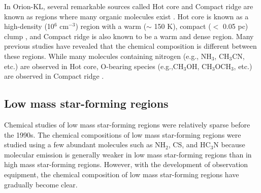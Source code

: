 In Orion-KL, several remarkable sources called Hot core and Compact ridge are known as regions where many organic molecules exist \citep{Blake+1987}. 
Hot core is known as a high-density (10$^6$ cm$^{-3}$) region with a warm ($\sim$ 150 K), compact ($<$ 0.05 pc) clump \citep{Zapata+2011}, and Compact ridge is also known to be a warm and dense region. 
Many previous studies have revealed that the chemical composition is different between these regions.
While many molecules containing nitrogen (e.g., NH$_3$, CH$_3$CN, etc.) are observed 
in Hot core, 
O-bearing species (e.g.,CH$_3$OH, CH$_3$OCH$_3$, etc.) are observed in Compact ridge \citep{Favre+2011a}.

\subsection{Low mass star-forming regions}
Chemical studies of low mass star-forming regions were relatively sparse before the 1990s.
The chemical compositions of low mass star-forming regions were studied using a few abundant
molecules such as NH$_2$, CS, and HC$_3$N because molecular emission is generally weaker in low mass star-forming regions than in high mass star-forming regions. 
However, with the development of observation equipment, the chemical composition of 
low mass star-forming regions have gradually become clear.

